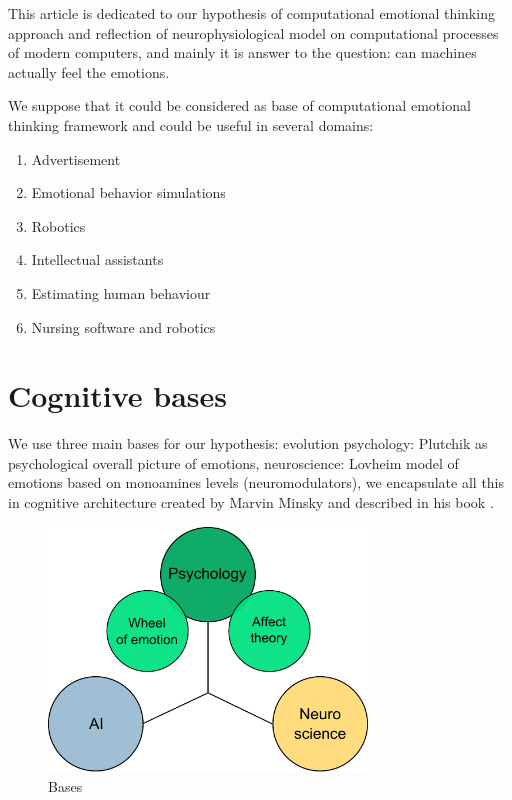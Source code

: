 This article is dedicated to our hypothesis of computational emotional thinking approach and reflection of neurophysiological model on computational processes of modern computers, and mainly it is answer to the question: can machines actually feel the emotions.

We suppose that it could be considered as base of computational emotional thinking framework and could be useful in several domains:

\begin{enumerate}
 \item  Advertisement
 \item  Emotional behavior simulations
 \item  Robotics
 \item  Intellectual assistants
 \item  Estimating human behaviour
 \item  Nursing software and robotics
\end{enumerate}

\section{Cognitive bases}

We use three main bases for our hypothesis: evolution psychology: Plutchik \cite{natureofemotions} as psychological overall picture of emotions, neuroscience: Lovheim \cite{cubeofemotions} model of emotions based on monoamines levels (neuromodulators), we encapsulate all this in cognitive architecture created by Marvin Minsky and described in his book \cite{emotionmachine}.

\begin{figure}
\begin{center}
 \includegraphics[height=6.5cm]{figure1_3_bases}
\end{center}
\caption{Bases}
\label{figure1_3_bases}
\end{figure}

